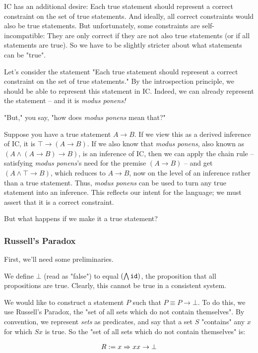 \documentclass{article}
\begin{document}
  IC has an additional desire: Each true statement should represent a correct constraint on the set of true statements. And ideally, all correct constraints would also be true statements. But unfortunately, some constraints are self-incompatible: They are only correct if they are not also true statements (or if all statements are true). So we have to be slightly stricter about what statements can be "true".
  
  Let's consider the statement "Each true statement should represent a correct constraint on the set of true statements." By the introspection principle, we should be able to represent this statement in IC. Indeed, we can already represent the statement – and it is \emph{modus ponens!}
  
  "But," you say, "how does \emph{modus ponens} mean that?"
  
  Suppose you have a true statement $A \to B$. If we view this as a derived inference of IC, it is $\top \to (A \to B)$. If we also know that \emph{modus ponens}, also known as $(A \wedge (A \to B) \to B)$, is an inference of IC, then we can apply the chain rule – satisfying \emph{modus ponens}'s need for the premise $(A \to B)$ – and get $(A \wedge \top \to B)$, which reduces to $A \to B$, now on the level of an inference rather than a true statement. Thus, \emph{modus ponens} can be used to turn any true statement into an inference. This reflects our intent for the language; we must assert that it is a correct constraint.
  
  But what happens if we make it a true statement?
  
  \subsubsection{Russell's Paradox}
  
  First, we'll need some preliminaries.
  
  We define $\bot$ (read as "false") to equal $(\bigwedge \operatorname{\texttt{id}})$, the proposition that all propositions are true. Clearly, this cannot be true in a consistent system.
  
  We would like to construct a statement $P$ such that $P \equiv P \to \bot$. To do this, we use Russell's Paradox, the "set of all sets which do not contain themselves". By convention, we represent \emph{sets} as predicates, and say that a set $S$ "contains" any $x$ for which $S x$ is true. So the "set of all sets which do not contain themselves" is:
  
  \begin{align*}
    R := x \Rightarrow x x \to \bot
  \end{align*}
  
\end{document}
